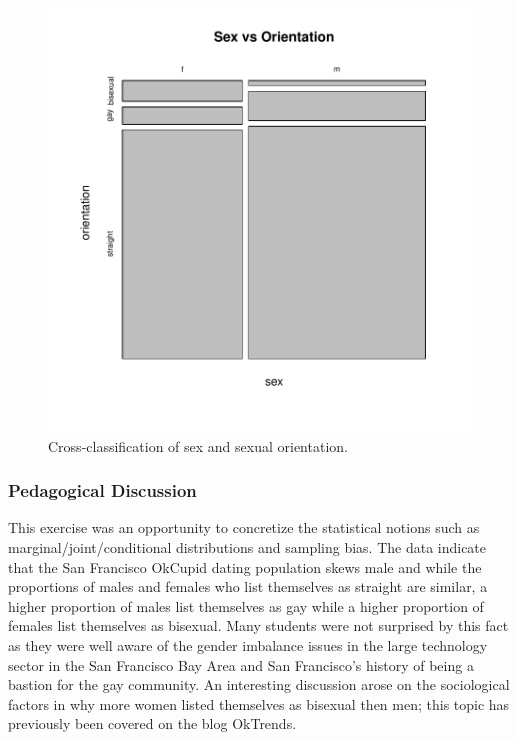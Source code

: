\documentclass{article}\usepackage[]{graphicx}\usepackage[]{color}
\makeatletter
\def\maxwidth{ %
  \ifdim\Gin@nat@width>\linewidth
    \linewidth
  \else
    \Gin@nat@width
  \fi
}
\newenvironment{knitrout}{}{} %
\makeatother
\begin{document}
\begin{knitrout}
\begin{figure}
{\centering \includegraphics[width=\maxwidth]{figure/sex_by_orientation-1} 

}

\caption[Cross-classification of sex and sexual orientation]{Cross-classification of sex and sexual orientation.}\label{fig:sex_by_orientation}
\end{figure}


\end{knitrout}




\subsubsection{Pedagogical Discussion}
This exercise was an opportunity to concretize the statistical notions such as marginal/joint/conditional distributions and sampling bias.  The data indicate that the San Francisco OkCupid dating population skews male and while the proportions of males and females who list themselves as straight are similar, a higher proportion of males list themselves as gay while a higher proportion of females list themselves as bisexual.  Many students were not surprised by this fact as they were well aware of the gender imbalance issues in the large technology sector in the San Francisco Bay Area and San Francisco's history of being a bastion for the gay community.  An interesting discussion arose on the sociological factors in why more women listed themselves as bisexual then men; this topic has previously been covered on the blog OkTrends\cite{OkTrendsLies}.
\end{document}
